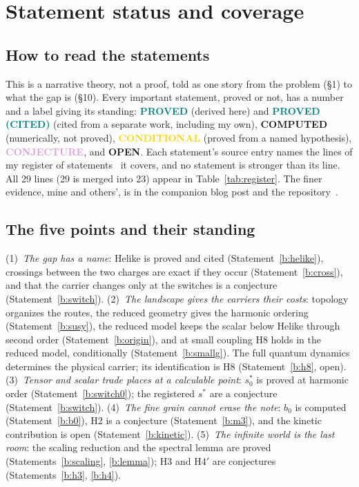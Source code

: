 \section{Statement status and coverage}\label{app:register}

\subsection*{How to read the statements}

This is a narrative theory, not a proof, told as one story from the problem (\S1)
to what the gap is (\S10). Every important statement, proved or not, has a number and a label giving its
standing: \textcolor{teal}{\textbf{PROVED}} (derived here) and \textcolor{teal}{\textbf{PROVED (CITED)}} (cited from a separate work, including my own),
\textcolor{sky}{\textbf{COMPUTED}} (numerically, not proved), \textcolor{gold}{\textbf{CONDITIONAL}} (proved from a
named hypothesis), \textcolor{plum}{\textbf{CONJECTURE}}, and \textcolor{muted}{\textbf{OPEN}}. Each statement's source entry names the lines
of my register of statements~\cite{ClosedSet} it covers, and no statement is stronger than its line. All 29 lines (29 is
merged into 23) appear in Table~\ref{tab:register}. The finer evidence, mine and
others', is in the companion blog post and the repository~\cite{HelikeReport}.

\subsection*{The five points and their standing}

(1)~\emph{The gap has a name}: Helike is proved and cited
(Statement~\ref{b:helike}), crossings between the two charges are exact if they occur (Statement~\ref{b:cross}), and that the carrier changes only at
the switches is a conjecture (Statement~\ref{b:switch}). (2)~\emph{The landscape gives the carriers their costs}: topology
organizes the routes, the reduced geometry gives the harmonic ordering (Statement~\ref{b:susy}), the reduced model keeps
the scalar below Helike through second order (Statement~\ref{b:origin}), and at small coupling H8 holds in the reduced
model, conditionally (Statement~\ref{b:smallg}). The full quantum dynamics determines the physical carrier; its
identification is H8 (Statement~\ref{b:h8}, open). (3)~\emph{Tensor and scalar trade
places at a calculable point}: $s_0^*$ is proved at harmonic order (Statement~\ref{b:switch0}); the registered $s^*$ are a
conjecture (Statement~\ref{b:switch}). (4)~\emph{The fine grain cannot erase the note}: $b_0$ is computed (Statement~\ref{b:b0}),
H2 is a conjecture (Statement~\ref{b:m3}), and the kinetic contribution is open (Statement~\ref{b:kinetic}). (5)~\emph{The infinite world is
the last room}: the scaling reduction and the spectral lemma are proved (Statements~\ref{b:scaling}, \ref{b:lemma}); H3 and
H4$'$ are conjectures (Statements~\ref{b:h3}, \ref{b:h4}).

